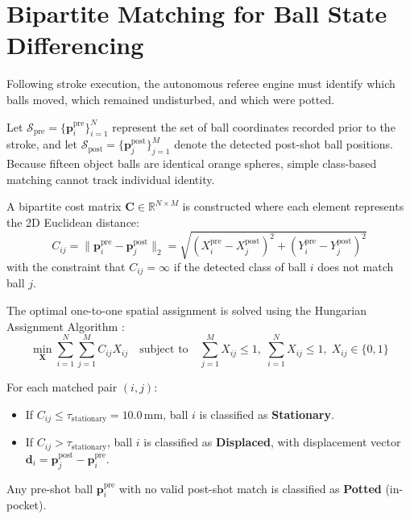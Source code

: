 \section{Bipartite Matching for Ball State Differencing}
Following stroke execution, the autonomous referee engine must identify which balls moved, which remained undisturbed, and which were potted.

Let $\mathcal{S}_{\text{pre}} = \{ \mathbf{p}_i^{\text{pre}} \}_{i=1}^{N}$ represent the set of ball coordinates recorded prior to the stroke, and let $\mathcal{S}_{\text{post}} = \{ \mathbf{p}_j^{\text{post}} \}_{j=1}^{M}$ denote the detected post-shot ball positions. Because fifteen object balls are identical orange spheres, simple class-based matching cannot track individual identity. 

A bipartite cost matrix $\mathbf{C} \in \mathbb{R}^{N \times M}$ is constructed where each element represents the 2D Euclidean distance:
\begin{equation}
    C_{ij} = \| \mathbf{p}_i^{\text{pre}} - \mathbf{p}_j^{\text{post}} \|_2 = \sqrt{(X_i^{\text{pre}} - X_j^{\text{post}})^2 + (Y_i^{\text{pre}} - Y_j^{\text{post}})^2}
\end{equation}
with the constraint that $C_{ij} = \infty$ if the detected class of ball $i$ does not match ball $j$.

The optimal one-to-one spatial assignment is solved using the Hungarian Assignment Algorithm \cite{ref40}:
\begin{equation}
    \min_{\mathbf{X}} \sum_{i=1}^N \sum_{j=1}^M C_{ij} X_{ij} \quad \text{subject to} \quad \sum_{j=1}^M X_{ij} \le 1, \; \sum_{i=1}^N X_{ij} \le 1, \; X_{ij} \in \{0, 1\}
\end{equation}

For each matched pair $(i, j)$:
\begin{itemize}
    \item If $C_{ij} \le \tau_{\text{stationary}} = 10.0\,\text{mm}$, ball $i$ is classified as \textbf{Stationary}.
    \item If $C_{ij} > \tau_{\text{stationary}}$, ball $i$ is classified as \textbf{Displaced}, with displacement vector $\mathbf{d}_i = \mathbf{p}_j^{\text{post}} - \mathbf{p}_i^{\text{pre}}$.
\end{itemize}
Any pre-shot ball $\mathbf{p}_i^{\text{pre}}$ with no valid post-shot match is classified as \textbf{Potted} (in-pocket).

